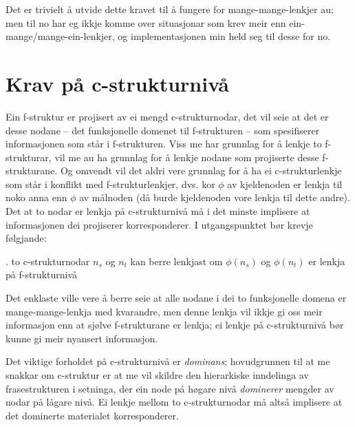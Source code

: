 \documentclass[11pt,a4paper,oneside,draft]{report}
\begin{document}
Det er trivielt å utvide dette kravet til å fungere for
mange-mange-lenkjer au; men til no har eg ikkje komme over situasjonar
som krev meir enn ein-mange/mange-ein-lenkjer, og implementasjonen min
held seg til desse for no.

\section{Krav på c-strukturnivå}
\label{sec-3.7}

\label{SEC:subnode}

Ein f-struktur er projisert av ei mengd c-strukturnodar, det vil seie
at det er desse nodane -- det funksjonelle domenet til f-strukturen --
som spesifiserer informasjonen som står i f-strukturen. Viss me har
grunnlag for å lenkje to f-strukturar, vil me au ha grunnlag for å
lenkje nodane som projiserte desse f-strukturane. Og omvendt vil det
aldri vere grunnlag for å ha ei c-strukturlenkje som står i konflikt
med f-strukturlenkjer, dvs. kor $\phi$ av kjeldenoden er lenkja til
noko anna enn $\phi$ av målnoden (då burde kjeldenoden vore lenkja til
dette andre). Det at to nodar er lenkja på c-strukturnivå må i det
minste implisere at informasjonen dei projiserer korresponderer. I
utgangspunktet bør krevje følgjande:

\ex.\label{krav:subnode-f-lenkja} to c-strukturnodar $n_s$ og $n_t$ kan
     berre lenkjast om $\phi(n_s)$ og $\phi(n_t)$ er lenkja på
     f-strukturnivå

Det enklaste ville vere å berre seie at alle nodane i dei to
funksjonelle domena er mange-mange-lenkja med kvarandre, men denne
lenkja vil ikkje gi oss meir informasjon enn at sjølve f-strukturane
er lenkja; ei lenkje på c-strukturnivå bør kunne gi meir nyansert
informasjon.

Det viktige forholdet på c-strukturnivå er \emph{dominans}; hovudgrunnen
til at me snakkar om c-struktur er at me vil skildre den hierarkiske
inndelinga av frasestrukturen i setninga, der ein node på høgare nivå
\emph{dominerer} mengder av nodar på lågare nivå. Ei lenkje mellom to
c-strukturnodar må altså implisere at det dominerte materialet
korresponderer.
\end{document}
